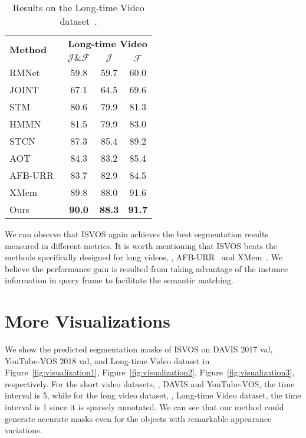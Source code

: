 \documentclass[10pt,twocolumn,letterpaper]{article}
\newcommand{\system}{ISVOS\xspace}
\begin{document}
\begin{table}[!ht]
	\centering
\setlength{\tabcolsep}{0pt} \begin{tabular*}{0.9\linewidth}{@{\extracolsep{\fill}}l | ccc }
		\toprule
		\multirow{2}{1in}{\textbf{Method}} & \multicolumn{3}{c}{\textbf{Long-time Video}}  \\
		~ & $\mathcal{J\&F}$ & $\mathcal{J}$ & $\mathcal{F}$ \\
		\midrule
		RMNet~\cite{xie2021efficient} & 59.8 & 59.7 & 60.0 \\
		JOINT~\cite{mao2021joint} & 67.1 & 64.5 & 69.6 \\
		STM~\cite{oh2019video} & 80.6 & 79.9 & 81.3 \\ 
		HMMN~\cite{shi2015hierarchical} & 81.5 & 79.9 & 83.0 \\
		STCN~\cite{cheng2021stcn} & 87.3 & 85.4 & 89.2  \\
		AOT~\cite{yang2021associating} & 84.3 & 83.2 & 85.4 \\
		AFB-URR~\cite{liang2020video} & 83.7 & 82.9 &  84.5 \\
		XMem~\cite{cheng2022xmem} & 89.8 & 88.0 & 91.6 \\
		Ours & \textbf{90.0} & \textbf{88.3} & \textbf{91.7} \\
		\bottomrule
	\end{tabular*}
	\caption{Results on the Long-time Video dataset~\cite{liang2020video}. }
	\label{tab:long}
\end{table}

We can observe that \system again achieves the best segmentation results measured in different metrics. It is worth mentioning that \system beats the methods specifically designed for long videos, \eg, AFB-URR~\cite{liang2020video} and XMem~\cite{cheng2022xmem}. We believe the performance gain is resulted from taking advantage of the instance information in query frame to facilitate the semantic matching.

\section{More Visualizations}

We show the predicted segmentation masks of \system on DAVIS 2017 val, YouTube-VOS 2018 val, and Long-time Video dataset in Figure~\ref{fig:visualization1}, Figure~\ref{fig:visualization2}, Figure~\ref{fig:visualization3}, respectively. For the short video datasets, \ie, DAVIS and YouTube-VOS, the time interval is 5, while for the long video dataset, \ie, Long-time Video dataset, the time interval is 1 since it is sparsely annotated. We can see that our method could generate accurate masks even for the objects with remarkable appearance variations.
\end{document}
